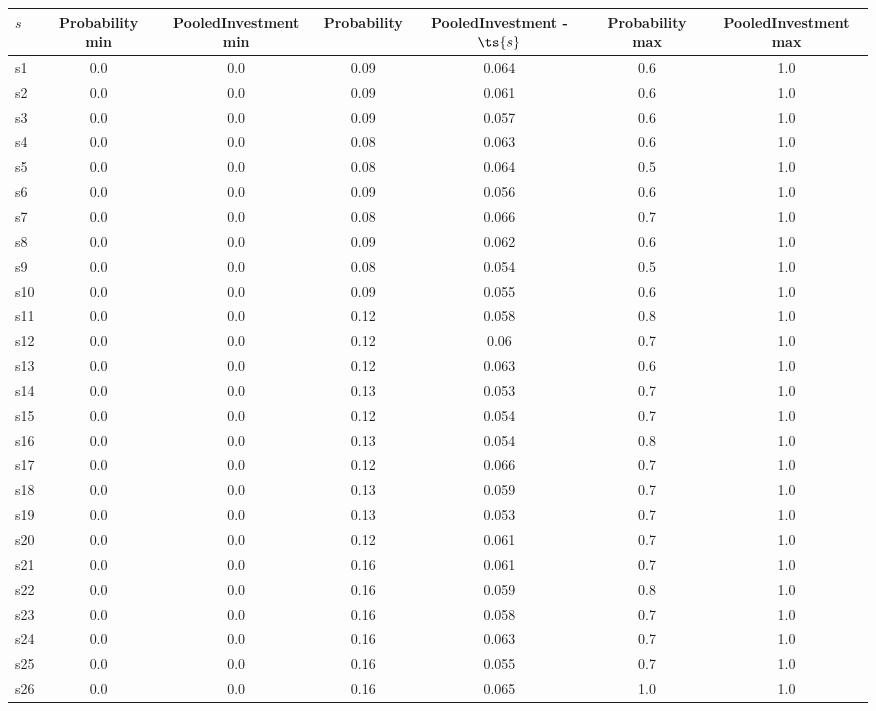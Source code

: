 \documentclass{article}
\begin{document}
\noindent\begin{tabular}{|l|c|c|c|c|c|c|}
\hline
$s$& Probability min & PooledInvestment min & Probability & PooledInvestment - $\ts{s}$ & Probability max & PooledInvestment max\\
\hline
s1 &0.0 & 0.0 & 0.09 & 0.064 & 0.6 & 1.0\\
\hline
s2 &0.0 & 0.0 & 0.09 & 0.061 & 0.6 & 1.0\\
\hline
s3 &0.0 & 0.0 & 0.09 & 0.057 & 0.6 & 1.0\\
\hline
s4 &0.0 & 0.0 & 0.08 & 0.063 & 0.6 & 1.0\\
\hline
s5 &0.0 & 0.0 & 0.08 & 0.064 & 0.5 & 1.0\\
\hline
s6 &0.0 & 0.0 & 0.09 & 0.056 & 0.6 & 1.0\\
\hline
s7 &0.0 & 0.0 & 0.08 & 0.066 & 0.7 & 1.0\\
\hline
s8 &0.0 & 0.0 & 0.09 & 0.062 & 0.6 & 1.0\\
\hline
s9 &0.0 & 0.0 & 0.08 & 0.054 & 0.5 & 1.0\\
\hline
s10 &0.0 & 0.0 & 0.09 & 0.055 & 0.6 & 1.0\\
\hline
s11 &0.0 & 0.0 & 0.12 & 0.058 & 0.8 & 1.0\\
\hline
s12 &0.0 & 0.0 & 0.12 & 0.06 & 0.7 & 1.0\\
\hline
s13 &0.0 & 0.0 & 0.12 & 0.063 & 0.6 & 1.0\\
\hline
s14 &0.0 & 0.0 & 0.13 & 0.053 & 0.7 & 1.0\\
\hline
s15 &0.0 & 0.0 & 0.12 & 0.054 & 0.7 & 1.0\\
\hline
s16 &0.0 & 0.0 & 0.13 & 0.054 & 0.8 & 1.0\\
\hline
s17 &0.0 & 0.0 & 0.12 & 0.066 & 0.7 & 1.0\\
\hline
s18 &0.0 & 0.0 & 0.13 & 0.059 & 0.7 & 1.0\\
\hline
s19 &0.0 & 0.0 & 0.13 & 0.053 & 0.7 & 1.0\\
\hline
s20 &0.0 & 0.0 & 0.12 & 0.061 & 0.7 & 1.0\\
\hline
s21 &0.0 & 0.0 & 0.16 & 0.061 & 0.7 & 1.0\\
\hline
s22 &0.0 & 0.0 & 0.16 & 0.059 & 0.8 & 1.0\\
\hline
s23 &0.0 & 0.0 & 0.16 & 0.058 & 0.7 & 1.0\\
\hline
s24 &0.0 & 0.0 & 0.16 & 0.063 & 0.7 & 1.0\\
\hline
s25 &0.0 & 0.0 & 0.16 & 0.055 & 0.7 & 1.0\\
\hline
s26 &0.0 & 0.0 & 0.16 & 0.065 & 1.0 & 1.0\\

\end{tabular}
\end{document}
